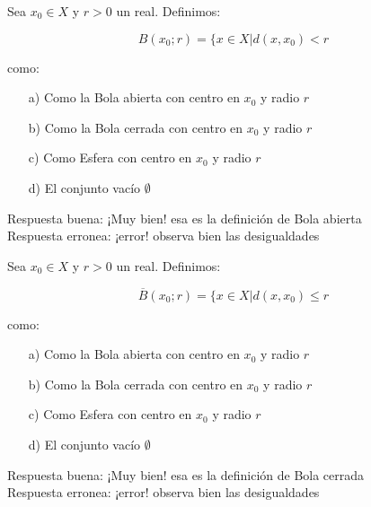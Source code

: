 \documentclass{exam}
\begin{document}
\begin{center}
\end{center}

\vspace{3mm}


\vspace{5mm}

\begin{questions}

\question Sea $x_0 \in X$ y $r>0$ un real. Definimos:

\[B(x_0; r) = \lbrace x \in X | d(x,x_0) < r \]

como:

\begin{itemize}
\item[a)] Como la Bola abierta con centro en $x_0$ y radio $r$
\item[b)] Como la Bola cerrada con centro en $x_0$ y radio $r$
\item[c)] Como Esfera con centro en $x_0$ y radio $r$
\item[d)] El conjunto vacío $\emptyset$
\end{itemize}

Respuesta buena: ¡Muy bien! esa es la definición de Bola abierta\\
Respuesta erronea: ¡error!  observa bien las desigualdades

\question Sea $x_0 \in X$ y $r>0$ un real. Definimos:

\[\overline{B}(x_0; r) = \lbrace x \in X | d(x,x_0) \leq r \]

como:

\begin{itemize}
\item[a)] Como la Bola abierta con centro en $x_0$ y radio $r$
\item[b)] Como la Bola cerrada con centro en $x_0$ y radio $r$
\item[c)] Como Esfera con centro en $x_0$ y radio $r$
\item[d)] El conjunto vacío $\emptyset$
\end{itemize}

Respuesta buena: ¡Muy bien! esa es la definición de Bola cerrada\\
Respuesta erronea: ¡error! observa bien las desigualdades


\end{questions}
\end{document}
